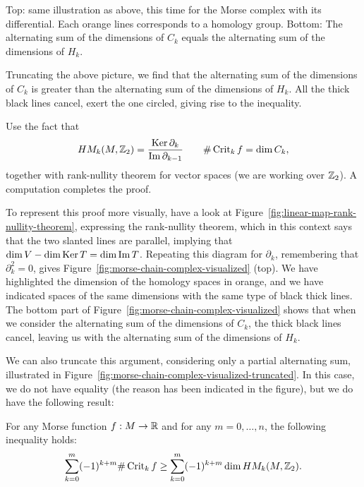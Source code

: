 \begin{marginfigure}
    \centering
    \caption{
        Top: same illustration as above, this time for the Morse complex with its differential.
        Each orange lines corresponds to a homology group.
        Bottom: The alternating sum of the dimensions of $C_k$ equals the alternating sum of the dimensions of $H_k$.
    }
    \label{fig:morse-chain-complex-visualized}
\end{marginfigure}
\begin{marginfigure}
    \centering
    \caption{Truncating the above picture, we find that the alternating sum of the dimensions of $C_k$ is greater than the alternating sum of the dimensions of  $H_k$. All the thick black lines cancel, exert the one circled, giving rise to the inequality.
    }
    \label{fig:morse-chain-complex-visualized-truncated}
\end{marginfigure}
\begin{myproof}
    Use the fact that
    \[
        \HMf[k]{M, \Z_2} = \frac{\Ker \partial_k}{\Im \partial_{k-1}} \qquad \# \Crit_k f = \dim C_k,
    \]
    together with rank-nullity theorem for vector spaces (we are working over $\Z_2$). A computation completes the proof.

    To represent this proof more visually, have a look at Figure~\ref{fig:linear-map-rank-nullity-theorem}, expressing the rank-nullity theorem, which in this context says that the two slanted lines are parallel, implying that $\dim V - \dim \Ker T = \dim \Im T$.
    Repeating this diagram for $\partial_k$, remembering that  $\partial_k^2 = 0$, gives Figure~\ref{fig:morse-chain-complex-visualized} (top). We have highlighted the dimension of the homology spaces in orange, and we have indicated spaces of the same dimensions with the same type of black thick lines.
    The bottom part of Figure~\ref{fig:morse-chain-complex-visualized} shows that when we consider the alternating sum of the dimensions of $C_k$, the thick black lines cancel, leaving us with the alternating sum of the dimensions of $H_k$.
    \end{myproof}

    We can also truncate this argument, considering only a partial alternating sum, illustrated in Figure~\ref{fig:morse-chain-complex-visualized-truncated}.
    In this case, we do not have equality (the reason has been indicated in the figure), but we do have the following result:
\begin{theorem}
    For any Morse function $f: M \to  \R$ and for any $m = 0, \ldots, n$, the following inequality holds:
    \[
        \sum_{k=0}^{m} (-1)^{k+m} \# \Crit_k f \ge  \sum_{k=0}^{m} (-1)^{k+m} \dim \HMf[k]{M, \Z_2}
    .\]
\end{theorem}

